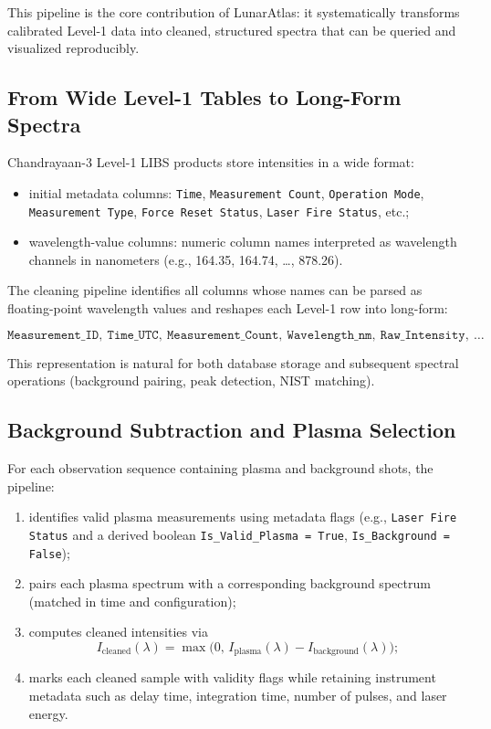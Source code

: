 \documentclass[12pt,a4paper]{article}
\begin{document}
This pipeline is the core contribution of LunarAtlas: it systematically transforms calibrated Level-1 data into cleaned, structured spectra that can be queried and visualized reproducibly.

\subsection{From Wide Level-1 Tables to Long-Form Spectra}

Chandrayaan-3 Level-1 LIBS products store intensities in a wide format:

\begin{itemize}[nosep]
  \item initial metadata columns: \texttt{Time}, \texttt{Measurement Count}, \texttt{Operation Mode}, \texttt{Measurement Type}, \texttt{Force Reset Status}, \texttt{Laser Fire Status}, etc.;
  \item wavelength-value columns: numeric column names interpreted as wavelength channels in nanometers (e.g., 164.35, 164.74, \ldots, 878.26).
\end{itemize}

The cleaning pipeline identifies all columns whose names can be parsed as floating-point wavelength values and reshapes each Level-1 row into long-form:

\[
\texttt{Measurement\_ID},\ \texttt{Time\_UTC},\ \texttt{Measurement\_Count},\ \texttt{Wavelength\_nm},\ \texttt{Raw\_Intensity},\ \ldots \tag{1}
\]

This representation is natural for both database storage and subsequent spectral operations (background pairing, peak detection, NIST matching).

\subsection{Background Subtraction and Plasma Selection}

For each observation sequence containing plasma and background shots, the pipeline:

\begin{enumerate}[nosep]
  \item identifies valid plasma measurements using metadata flags (e.g., \texttt{Laser Fire Status} and a derived boolean \texttt{Is\_Valid\_Plasma = True}, \texttt{Is\_Background = False});
  \item pairs each plasma spectrum with a corresponding background spectrum (matched in time and configuration);
  \item computes cleaned intensities via
  \[
  I_{\text{cleaned}}(\lambda) = \max\bigl(0,\, I_{\text{plasma}}(\lambda) - I_{\text{background}}(\lambda)\bigr); \tag{2}
  \]
  \item marks each cleaned sample with validity flags while retaining instrument metadata such as delay time, integration time, number of pulses, and laser energy.
\end{enumerate}
\end{document}
